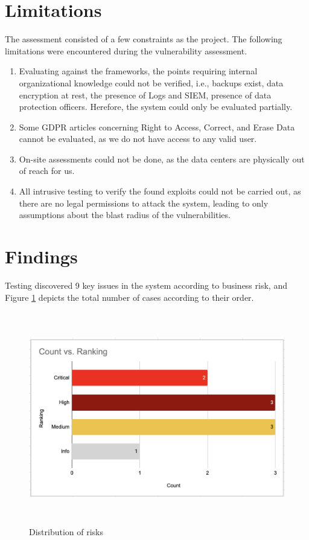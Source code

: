 \section{Limitations}
The assessment consisted of a few constraints as the project. The following limitations were encountered during the vulnerability assessment.
\begin{enumerate}
    \item Evaluating against the frameworks, the points requiring internal organizational knowledge could not be verified, i.e., backups exist, data encryption at rest, the presence of Logs and SIEM, presence of data protection officers. Herefore, the system could only be evaluated partially. 
    \item Some GDPR articles concerning Right to Access, Correct, and Erase Data cannot be evaluated, as we do not have access to any valid user. 
    \item On-site assessments could not be done, as the data centers are physically out of reach for us.
    \item All intrusive testing to verify the found exploits could not be carried out, as there are no legal permissions to attack the system, leading to only assumptions about the blast radius of the vulnerabilities.
\end{enumerate}





\section{Findings}
Testing discovered 9 key issues in the system according to business risk, and Figure \ref{fig:bar_rankings} depicts the total number of cases according to their order.

\newline
\begin{figure}[h!]
\centering
\includegraphics[width=\textwidth, height=350px]{pics/rankings.png}
\caption{Distribution of risks}\label{fig:bar_rankings}
\end{figure}


